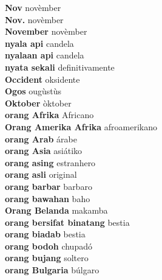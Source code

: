 \textbf{ Nov  } novèmber \\
\textbf{ Nov.  } novèmber \\
\textbf{ November  } novèmber \\
\textbf{ nyala api  } candela \\
\textbf{ nyalaan api  } candela \\
\textbf{ nyata sekali  } definitivamente \\
\textbf{ Occident  } oksidente \\
\textbf{ Ogos  } ougùstùs \\
\textbf{ Oktober  } òktober \\
\textbf{ orang Afrika  } Africano \\
\textbf{ Orang Amerika Afrika  } afroamerikano \\
\textbf{ orang Arab  } árabe \\
\textbf{ orang Asia  } asiátiko \\
\textbf{ orang asing  } estranhero \\
\textbf{ orang asli  } original \\
\textbf{ orang barbar  } barbaro \\
\textbf{ orang bawahan  } baho \\
\textbf{ Orang Belanda  } makamba \\
\textbf{ orang bersifat binatang  } bestia \\
\textbf{ orang biadab  } bestia \\
\textbf{ orang bodoh  } chupadó \\
\textbf{ orang bujang  } soltero \\
\textbf{ orang Bulgaria  } búlgaro \\
